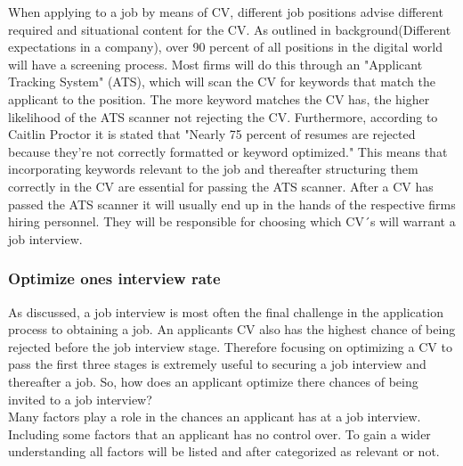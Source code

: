 When applying to a job by means of CV, different job positions advise different required and situational content for the CV.
As outlined in background(Different expectations in a company), over 90 percent of all positions in the digital world will have a screening process.
Most firms will do this through an "Applicant Tracking System" (ATS), which will scan the CV for keywords that match the applicant to the position.
The more keyword matches the CV has, the higher likelihood of the ATS scanner not rejecting the CV.
Furthermore, according to Caitlin Proctor it is stated that "Nearly 75 percent of resumes are rejected because they’re not correctly formatted or keyword optimized."
This means that incorporating keywords relevant to the job and thereafter structuring them correctly in the CV are essential for passing the ATS scanner.
After a CV has passed the ATS scanner it will usually end up in the hands of the respective firms hiring personnel. 
They will be responsible for choosing which CV´s will warrant a job interview. \\

\subsubsection{Optimize ones interview rate}
As discussed, a job interview is most often the final challenge in the application process to obtaining a job. 
An applicants CV also has the highest chance of being rejected before the job interview stage.
Therefore focusing on optimizing a CV to pass the first three stages is extremely useful to securing a job interview and thereafter a job.
So, how does an applicant optimize there chances of being invited to a job interview? \\

Many factors play a role in the chances an applicant has at a job interview.
Including some factors that an applicant has no control over.
To gain a wider understanding all factors will be listed and after categorized as relevant or not. \\

